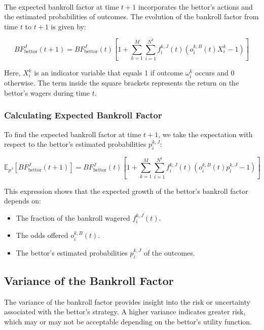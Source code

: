 \paragraph{}
The expected bankroll factor at time \( t+1 \) incorporates the bettor's actions and the estimated probabilities of outcomes. The evolution of the bankroll factor from time \( t \) to \( t+1 \) is given by:

\[
BF_{\text{bettor}}^J(t+1) = BF_{\text{bettor}}^J(t) \left[ 1 + \sum_{k=1}^{M} \sum_{i=1}^{N^k} f_i^{k,J}(t) \left( o_i^{k,B}(t) X_i^k - 1 \right) \right]
\]

Here, \( X_i^k \) is an indicator variable that equals 1 if outcome \( \omega_i^k \) occurs and 0 otherwise. The term inside the square brackets represents the return on the bettor's wagers during time \( t \).

\subsubsection{Calculating Expected Bankroll Factor}

To find the expected bankroll factor at time \( t+1 \), we take the expectation with respect to the bettor's estimated probabilities \( p_i^{k,J} \):

\[
\mathbb{E}_{p^{J}}\left[ BF_{\text{bettor}}^J(t+1) \right] = BF_{\text{bettor}}^J(t) \left[ 1 + \sum_{k=1}^{M} \sum_{i=1}^{N^k} f_i^{k,J}(t) \left( o_i^{k,B}(t) p_i^{k,J} - 1 \right) \right]
\]

This expression shows that the expected growth of the bettor's bankroll factor depends on:

\begin{itemize}
    \item The fraction of the bankroll wagered \( f_i^{k,J}(t) \).
    \item The odds offered \( o_i^{k,B}(t) \).
    \item The bettor's estimated probabilities \( p_i^{k,J} \) of the outcomes.
\end{itemize}



\subsection{Variance of the Bankroll Factor}

The variance of the bankroll factor provides insight into the risk or uncertainty associated with the bettor's strategy. A higher variance indicates greater risk, which may or may not be acceptable depending on the bettor's utility function.

